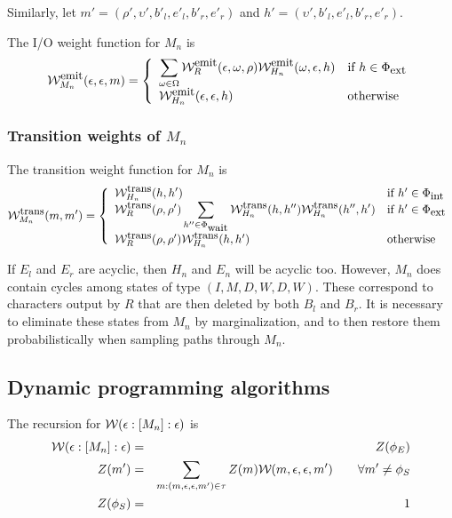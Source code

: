 \documentclass{article}
\newcommand{\seclabel}[1]{\label{sec.#1}}
\newcommand\wtrans[4]{#1(#2 : [#3] : #4)}
\newcommand\States{\Phi}
\newcommand\statesof[1]{\States_{#1}}
\newcommand\Transitions{\tau}
\newcommand\startstate{\phi_S}
\newcommand\laststate{\phi_E}
\newcommand\weight{{\cal W}}
\newcommand\weightfunof[1]{\weight_{#1}}
\newcommand\transweightfun[1]{\weightfunof{#1}^{\mbox{\small trans}}}
\newcommand\emitweightfun[1]{\weightfunof{#1}^{\mbox{\small emit}}}
\newcommand\stateset[1]{\statesof{\mbox{\small #1}}}
\newcommand\hstatedest{(\upsilon',b'_l,e'_l,b'_r,e'_r)}
\newcommand\externalsuffix{ext}
\newcommand\internalsuffix{int}
\newcommand\waitsuffix{wait}
\newcommand\externalcascades{\stateset{\externalsuffix}}
\newcommand\internalcascades{\stateset{\internalsuffix}}
\newcommand\waitstates{\stateset{\waitsuffix}}
\newcommand\mstatedest{(\rho',\upsilon',b'_l,e'_l,b'_r,e'_r)}
\begin{document}
Similarly, let $m' = \mstatedest$ and $h' = \hstatedest$.

The I/O weight function for $M_n$ is
\[
\emitweightfun{M_n}(\epsilon,\epsilon,m) = \left\{
\begin{array}{ll}
\displaystyle
\sum_{\omega \in \Omega} \emitweightfun{R}(\epsilon,\omega,\rho) \emitweightfun{H_n}(\omega,\epsilon,h)
 & \mbox{if $h \in \externalcascades$} \\
\emitweightfun{H_n}(\epsilon,\epsilon,h)
 & \mbox{otherwise}
\end{array}
\right.
\]

\subsubsection{Transition weights of $M_n$}
The transition weight function for $M_n$ is
\[
\transweightfun{M_n}(m,m') = \left\{
\begin{array}{ll}
\displaystyle
\transweightfun{H_n}(h,h')
 & \mbox{if $h' \in \internalcascades$} \\
\displaystyle
\transweightfun{R}(\rho,\rho') \sum_{h'' \in \waitstates} \transweightfun{H_n}(h,h'') \transweightfun{H_n}(h'',h')
 & \mbox{if $h' \in \externalcascades$} \\
\transweightfun{R}(\rho,\rho') \transweightfun{H_n}(h,h')
 & \mbox{otherwise}
\end{array}
\right.
\]

If $E_l$ and $E_r$ are acyclic, then $H_n$ and $E_n$ will be acyclic too.
However, $M_n$ does contain cycles among states of type $(I,M,D,W,D,W)$.
These correspond to characters output by $R$ that are then deleted by both $B_l$ and $B_r$.
It is necessary to eliminate these states from $M_n$ by marginalization, and to then restore them probabilistically when sampling paths through $M_n$.

\subsection{Dynamic programming algorithms}
\seclabel{DynamicProgramming}
The recursion for $\wtrans{\weight}{\epsilon}{M_n}{\epsilon}$ is
\begin{eqnarray*}
\wtrans{\weight}{\epsilon}{M_n}{\epsilon} & = & Z(\laststate) \\
Z(m') & = & \sum_{m : (m,\epsilon,\epsilon,m') \in \Transitions} Z(m) \weightfunof{}(m,\epsilon,\epsilon,m')  \quad\quad \forall m' \neq \startstate \\
Z(\startstate) & = & 1
\end{eqnarray*}
\end{document}
